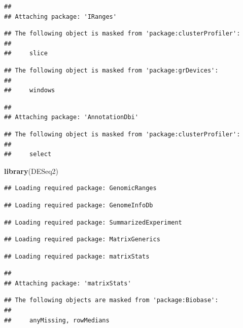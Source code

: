\documentclass[
]{article}
\newenvironment{Shaded}{\begin{snugshade}}{\end{snugshade}}
\newcommand{\FunctionTok}[1]{\textcolor[rgb]{0.13,0.29,0.53}{\textbf{#1}}}
\newcommand{\NormalTok}[1]{#1}
\begin{document}
\begin{verbatim}
## 
## Attaching package: 'IRanges'
\end{verbatim}

\begin{verbatim}
## The following object is masked from 'package:clusterProfiler':
## 
##     slice
\end{verbatim}

\begin{verbatim}
## The following object is masked from 'package:grDevices':
## 
##     windows
\end{verbatim}

\begin{verbatim}
## 
## Attaching package: 'AnnotationDbi'
\end{verbatim}

\begin{verbatim}
## The following object is masked from 'package:clusterProfiler':
## 
##     select
\end{verbatim}

\begin{Shaded}
\begin{Highlighting}[]
\FunctionTok{library}\NormalTok{(DESeq2)}
\end{Highlighting}
\end{Shaded}

\begin{verbatim}
## Loading required package: GenomicRanges
\end{verbatim}

\begin{verbatim}
## Loading required package: GenomeInfoDb
\end{verbatim}

\begin{verbatim}
## Loading required package: SummarizedExperiment
\end{verbatim}

\begin{verbatim}
## Loading required package: MatrixGenerics
\end{verbatim}

\begin{verbatim}
## Loading required package: matrixStats
\end{verbatim}

\begin{verbatim}
## 
## Attaching package: 'matrixStats'
\end{verbatim}

\begin{verbatim}
## The following objects are masked from 'package:Biobase':
## 
##     anyMissing, rowMedians
\end{verbatim}
\end{document}
